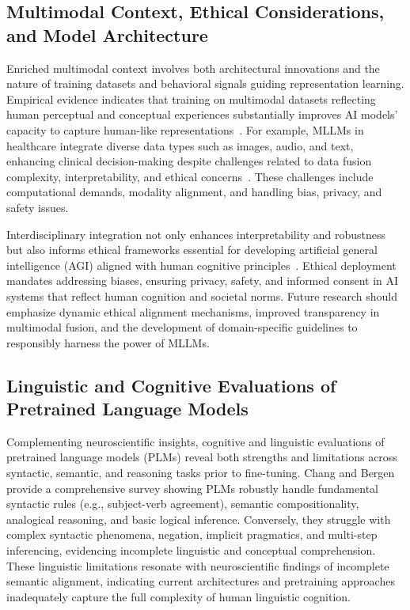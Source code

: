 \documentclass[sigconf]{acmart}
\begin{document}
\subsection{Multimodal Context, Ethical Considerations, and Model Architecture}

Enriched multimodal context involves both architectural innovations and the nature of training datasets and behavioral signals guiding representation learning. Empirical evidence indicates that training on multimodal datasets reflecting human perceptual and conceptual experiences substantially improves AI models’ capacity to capture human-like representations~\cite{ref4,ref5}. For example, MLLMs in healthcare integrate diverse data types such as images, audio, and text, enhancing clinical decision-making despite challenges related to data fusion complexity, interpretability, and ethical concerns~\cite{ref4,ref5}. These challenges include computational demands, modality alignment, and handling bias, privacy, and safety issues.

Interdisciplinary integration not only enhances interpretability and robustness but also informs ethical frameworks essential for developing artificial general intelligence (AGI) aligned with human cognitive principles~\cite{ref2,ref4,ref5}. Ethical deployment mandates addressing biases, ensuring privacy, safety, and informed consent in AI systems that reflect human cognition and societal norms. Future research should emphasize dynamic ethical alignment mechanisms, improved transparency in multimodal fusion, and the development of domain-specific guidelines to responsibly harness the power of MLLMs.

\subsection{Linguistic and Cognitive Evaluations of Pretrained Language Models}

Complementing neuroscientific insights, cognitive and linguistic evaluations of pretrained language models (PLMs) reveal both strengths and limitations across syntactic, semantic, and reasoning tasks prior to fine-tuning. Chang and Bergen~\cite{ref34} provide a comprehensive survey showing PLMs robustly handle fundamental syntactic rules (e.g., subject-verb agreement), semantic compositionality, analogical reasoning, and basic logical inference. Conversely, they struggle with complex syntactic phenomena, negation, implicit pragmatics, and multi-step inferencing, evidencing incomplete linguistic and conceptual comprehension. These linguistic limitations resonate with neuroscientific findings of incomplete semantic alignment, indicating current architectures and pretraining approaches inadequately capture the full complexity of human linguistic cognition.
\end{document}
